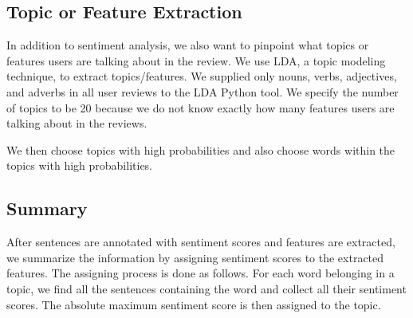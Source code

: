 \subsection{Topic or Feature Extraction}
In addition to sentiment analysis, we also want to pinpoint what topics or features users are talking about in the review. We use LDA, a topic modeling technique, to extract topics/features. We supplied only nouns, verbs, adjectives, and adverbs in all user reviews to the LDA Python tool. We specify the number of topics to be 20 because we do not know exactly how many features users are talking about in the reviews.

We then choose topics with high probabilities and also choose words within the topics with high probabilities.


\subsection{Summary}
After sentences are annotated with sentiment scores and features are extracted, we summarize the information by assigning sentiment scores to the extracted features. The assigning process is done as follows. For each word belonging in a topic, we find all the sentences containing the word and collect all their sentiment scores. The absolute maximum sentiment score is then assigned to the topic.




